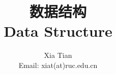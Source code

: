 \documentclass[table, 13pt, slidestop,compress,mathserif]{beamer}
\begin{document}
\title{数据结构 \\ Data Structure}
\author{Xia Tian \\ Email: xiat(at)ruc.edu.cn }
\date{
}
\frame{\titlepage}


%
% 
% 
\end{document}

